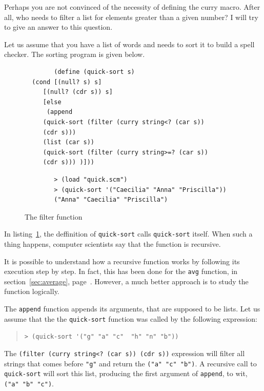 \documentclass[a4paper,12pt]{book}
\newenvironment{fmpage}[1]
{\begin{lrbox}{\fmbox}\begin{minipage}{#1}}
{\end{minipage}\end{lrbox}\fbox{\usebox{\fmbox}}}
\begin{document}
Perhaps you are not convinced of the
necessity of defining the curry macro.
After all, who  needs to filter a list
for elements greater than a given number?
I will try to give an answer to this
question.

Let us assume that you have a list
of words and needs to sort it
to build a spell checker. The sorting
program is given below.



\begin{figure}[!h]
	\begin{fmpage}{\linewidth}
		\begin{verbatim}
		(define (quick-sort s)
  (cond [(null? s) s]
     [(null? (cdr s)) s]
     [else 
      (append 
	 (quick-sort (filter (curry string<? (car s)) 
	 (cdr s)))
	 (list (car s))
	 (quick-sort (filter (curry string>=? (car s))
	 (cdr s))) )]))
		\end{verbatim}
	\end{fmpage}

	\begin{fmpage}{\linewidth}
		\begin{verbatim}
		> (load "quick.scm")
		> (quick-sort '("Caecilia" "Anna" "Priscilla"))
		("Anna" "Caecilia" "Priscilla")
		\end{verbatim}
	\end{fmpage}
	\caption{The filter function}
	\label{fig:filter}
\end{figure}

In listing~\ref{fig:filter}, the deffinition of
\verb|quick-sort| calls \verb|quick-sort| itself.
When such a thing happens, computer scientists
say that the function is recursive.

It is possible to understand how a recursive
function works by following its execution
step by step. In fact, this has been done
for the \verb|avg| function, in section~\ref{sec:average},
page~\pageref{sec:average}. However, a much
better approach is to study the function logically.

The \verb|append| function appends its
arguments, that are supposed to be lists.
Let us assume that the the \verb|quick-sort|
function was called by the following expression:
\begin{quote}
	\verb|> (quick-sort '("g" "a" "c"  "h" "n" "b"))|
\end{quote}
The \verb|(filter (curry string<? (car s)) (cdr s))|
expression will filter all strings that comes before
\verb|"g"| and return the \verb|("a" "c" "b")|.
A recursive call to \verb|quick-sort| will
sort this list, producing the first argument
of \verb|append|, to wit, \verb|("a" "b" "c")|.
\end{document}
